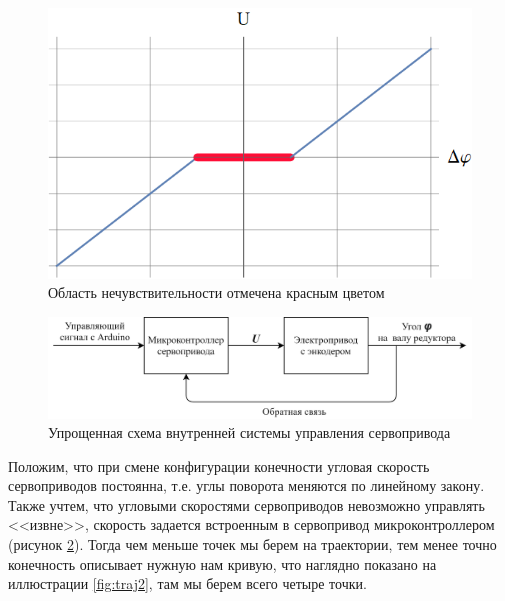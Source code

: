 \begin{figure}[h]
    \centering
    \includegraphics[scale=0.6]{chapter_walking_model/figure2.png}
    \caption{Область нечувствительности отмечена красным цветом}
    \label{fig:nonff}
\end{figure}

\begin{figure}[h]
    \centering
    \includegraphics[width=\textwidth]{chapter_walking_model/figure1.png}
    \caption{Упрощенная схема внутренней системы управления сервопривода}
    \label{fig:upr_servo}
\end{figure}

Положим, что при смене конфигурации конечности угловая скорость сервоприводов постоянна, т.е. углы поворота меняются по линейному закону. Также учтем, что угловыми скоростями сервоприводов невозможно управлять <<извне>>, скорость задается встроенным в сервопривод микроконтроллером (рисунок \ref{fig:upr_servo}). Тогда чем меньше точек мы берем на траектории, тем менее точно конечность описывает нужную нам кривую, что наглядно показано на иллюстрации \ref{fig:traj2}, там мы берем всего четыре точки.


